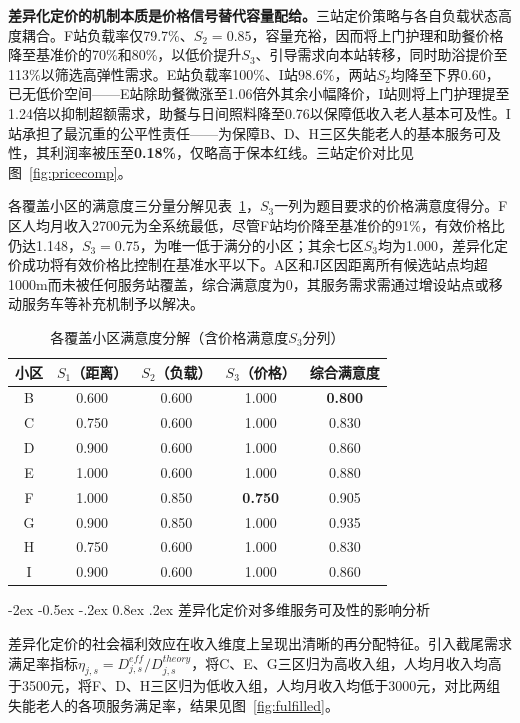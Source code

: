 \documentclass[zihao=-4]{cumcmthesis}
\makeatletter
\renewcommand\subsection{\@startsection{subsection}{2}{\z@}%
    {-2ex \@plus -0.5ex \@minus -.2ex}%
    {0.8ex \@plus .2ex}%
    {\normalfont\normalsize\bfseries}}
\makeatother
\begin{document}
\textbf{差异化定价的机制本质是价格信号替代容量配给。}三站定价策略与各自负载状态高度耦合。F站负载率仅79.7\%、$S_2=0.85$，容量充裕，因而将上门护理和助餐价格降至基准价的70\%和80\%，以低价提升$S_3$、引导需求向本站转移，同时助浴提价至113\%以筛选高弹性需求。E站负载率100\%、I站98.6\%，两站$S_2$均降至下界0.60，已无低价空间——E站除助餐微涨至1.06倍外其余小幅降价，I站则将上门护理提至1.24倍以抑制超额需求，助餐与日间照料降至0.76以保障低收入老人基本可及性。I站承担了最沉重的公平性责任——为保障B、D、H三区失能老人的基本服务可及性，其利润率被压至\textbf{0.18\%}，仅略高于保本红线。三站定价对比见图~\ref{fig:pricecomp}。

各覆盖小区的满意度三分量分解见表~\ref{tab:q3commsat}，$S_3$一列为题目要求的价格满意度得分。F区人均月收入2700元为全系统最低，尽管F站均价降至基准价的91\%，有效价格比仍达1.148，$S_3=0.75$，为唯一低于满分的小区；其余七区$S_3$均为1.000，差异化定价成功将有效价格比控制在基准水平以下。A区和J区因距离所有候选站点均超1000m而未被任何服务站覆盖，综合满意度为0，其服务需求需通过增设站点或移动服务车等补充机制予以解决。

\begin{table}[H]
\centering
\caption{各覆盖小区满意度分解（含价格满意度$S_3$分列）}
\label{tab:q3commsat}
\begin{tabular}{ccccc}
\toprule
小区 & $S_1$（距离） & $S_2$（负载） & $S_3$（价格） & 综合满意度 \\
\midrule
B & 0.600 & 0.600 & 1.000 & \textbf{0.800} \\
C & 0.750 & 0.600 & 1.000 & 0.830 \\
D & 0.900 & 0.600 & 1.000 & 0.860 \\
E & 1.000 & 0.600 & 1.000 & 0.880 \\
F & 1.000 & 0.850 & \textbf{0.750} & 0.905 \\
G & 0.900 & 0.850 & 1.000 & 0.935 \\
H & 0.750 & 0.600 & 1.000 & 0.830 \\
I & 0.900 & 0.600 & 1.000 & 0.860 \\
\bottomrule
\end{tabular}
\end{table}

\subsection{差异化定价对多维服务可及性的影响分析}


差异化定价的社会福利效应在收入维度上呈现出清晰的再分配特征。引入截尾需求满足率指标$\eta_{j,s} = D_{j,s}^{eff} / D_{j,s}^{theory}$，将C、E、G三区归为高收入组，人均月收入均高于3500元，将F、D、H三区归为低收入组，人均月收入均低于3000元，对比两组失能老人的各项服务满足率，结果见图~\ref{fig:fulfilled}。
\end{document}
